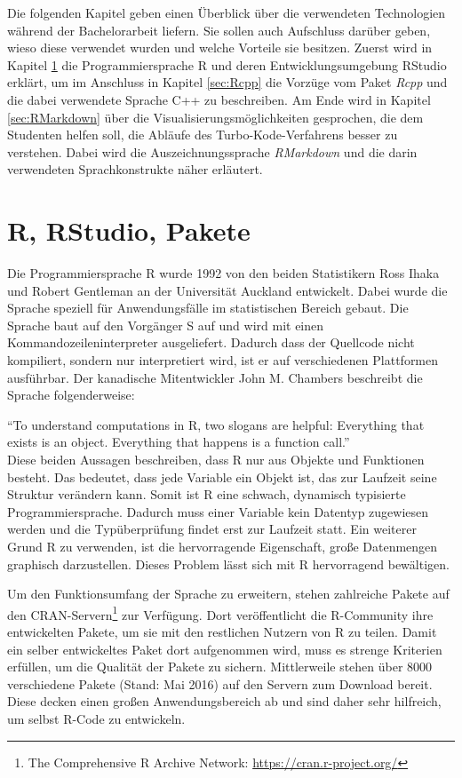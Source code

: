 Die folgenden Kapitel geben einen Überblick über die verwendeten Technologien während der Bachelorarbeit liefern. Sie sollen auch Aufschluss darüber geben, wieso diese verwendet wurden und welche Vorteile sie besitzen. Zuerst wird in Kapitel \ref{sec:R} die Programmiersprache R und deren Entwicklungsumgebung RStudio erklärt, um im Anschluss in Kapitel \ref{sec:Rcpp} die Vorzüge vom Paket \emph{Rcpp} und die dabei verwendete Sprache C++ zu beschreiben. Am Ende wird in Kapitel \ref{sec:RMarkdown} über die Visualisierungsmöglichkeiten gesprochen, die dem Studenten helfen soll, die Abläufe des Turbo-Kode-Verfahrens besser zu verstehen. Dabei wird die Auszeichnungssprache \emph{RMarkdown} und die darin verwendeten Sprachkonstrukte näher erläutert.

\section{R, RStudio, Pakete}
\label{sec:R}
Die Programmiersprache R wurde 1992 von den beiden Statistikern  Ross Ihaka und Robert Gentleman an der Universität Auckland entwickelt. Dabei wurde die Sprache speziell für Anwendungsfälle im statistischen Bereich gebaut. Die Sprache baut auf den Vorgänger S auf und wird mit einen Kommandozeileninterpreter ausgeliefert. Dadurch dass der Quellcode nicht kompiliert, sondern nur interpretiert wird, ist er auf verschiedenen Plattformen ausführbar. Der kanadische Mitentwickler John M. Chambers beschreibt die Sprache folgenderweise:

\enquote{To understand computations in R, two slogans are helpful: Everything that exists is an object. Everything that happens is a function call.} \cite{chambers2014object}\\

Diese beiden Aussagen beschreiben, dass R nur aus Objekte und Funktionen besteht. Das bedeutet, dass jede Variable ein Objekt ist, das zur Laufzeit seine Struktur verändern kann. Somit ist R eine schwach, dynamisch typisierte Programmiersprache. Dadurch muss einer Variable kein Datentyp zugewiesen werden und die Typüberprüfung findet erst zur Laufzeit statt. Ein weiterer Grund R zu verwenden, ist die hervorragende Eigenschaft, große Datenmengen graphisch darzustellen. Dieses Problem lässt sich mit R hervorragend bewältigen.

Um den Funktionsumfang der Sprache zu erweitern, stehen zahlreiche Pakete auf den CRAN-Servern\footnote{The Comprehensive R Archive Network: \url{https://cran.r-project.org/}} zur Verfügung. Dort veröffentlicht die R-Community ihre entwickelten Pakete, um sie mit den restlichen Nutzern von R zu teilen. Damit ein selber entwickeltes Paket dort aufgenommen wird, muss es strenge Kriterien erfüllen, um die Qualität der Pakete zu sichern. Mittlerweile stehen über 8000 verschiedene Pakete (Stand: Mai 2016) auf den Servern zum Download bereit. Diese decken einen großen Anwendungsbereich ab und sind daher sehr hilfreich, um selbst R-Code zu entwickeln\cite{rmanual}.

